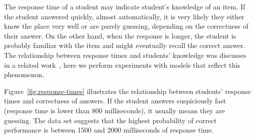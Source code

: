 The response time of a student may indicate student's knowledge of an item. If the student answered quickly, almost automatically, it is very likely they either know the place very well or are purely guessing, depending on the correctness of their answer. On the other hand, when the response is longer, the student is probably familiar with the item and might eventually recall the correct answer. The relationship between response times and students' knowledge was discusses in a related work~\cite{papouvsekanalysis}, here we perform experiments with models that reflect this phenomenon.

Figure~\ref{fig:response-times} illustrates the relationship between students' response times and correctness of answers. If the student answers suspiciously fast (response time is lower than 800 milliseconds), it usually means they are guessing. The data set suggests that the highest probability of correct performance is between 1500 and 2000 milliseconds of response time.

